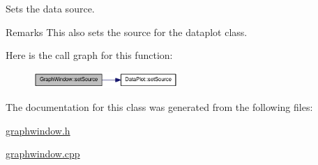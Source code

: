 Sets the data source. 

\begin{DoxyRemark}{Remarks}
This also sets the source for the dataplot class. 
\end{DoxyRemark}


Here is the call graph for this function:\nopagebreak
\begin{figure}[H]
\begin{center}
\leavevmode
\includegraphics[width=155pt]{classGraphWindow_a07a46e21184c287ba49db8145047e420_cgraph}
\end{center}
\end{figure}




The documentation for this class was generated from the following files:\begin{DoxyCompactItemize}
\item 
\hyperlink{graphwindow_8h}{graphwindow.h}\item 
\hyperlink{graphwindow_8cpp}{graphwindow.cpp}\end{DoxyCompactItemize}
